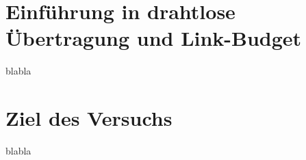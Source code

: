     \section{Einführung in drahtlose Übertragung und Link-Budget}
    blabla
    \section{Ziel des Versuchs}
    blabla
\clearpage
